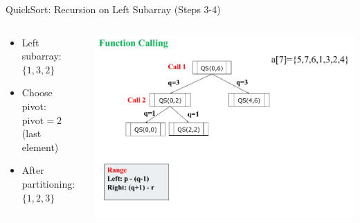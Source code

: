 \begin{frame}{QuickSort: Recursion on Left Subarray (Steps 3-4)}
  \begin{columns}
    \begin{column}{0.4\textwidth}
      \begin{itemize}
        \item Left subarray: $\{1,3,2\}$
        \item Choose pivot: $\text{pivot} = 2$ (last element)
        \item After partitioning: $\{1, 2, 3\}$
      \end{itemize}
    \end{column}
    \begin{column}{0.6\textwidth}
      \includegraphics[width=\textwidth]{assets/Qu2.png}
    \end{column}
  \end{columns}
\end{frame}



